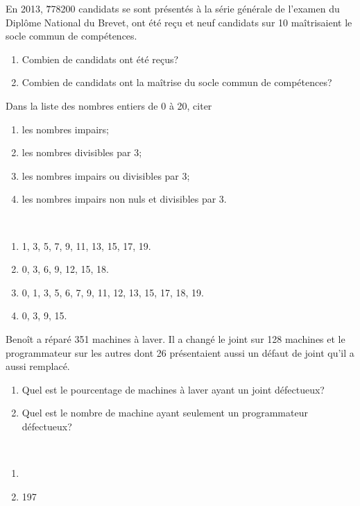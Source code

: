 \begin{autoeval}
\begin{multicols}{2}
\begin{exercice}
 	En 2013, \u{778200} candidats se sont présentés à la série générale de l'examen du Diplôme National du Brevet,  ont été reçu et neuf candidats sur 10 maîtrisaient le socle commun de compétences.
 	\begin{enumerate}
 	\item Combien de candidats ont été reçus?
 	\item Combien de candidats ont la maîtrise du socle commun de compétences?
 	\end{enumerate}
 	\begin{corrige}
 	\begin{colenumerate}{2}
 	\item {}
 	\item {}
 	\end{colenumerate}
 	\end{corrige}
 	\end{exercice}
 	\begin{exercice}
 	Dans la liste des nombres entiers de 0 à 20, citer 
 	\begin{enumerate}
 	\item les nombres impairs;
 	\item les nombres divisibles par 3;
 	\item les nombres impairs ou divisibles par 3;
 	\item les nombres impairs non nuls et divisibles par 3.
 	\end{enumerate} 	
 	\begin{corrige}
 	~\\
 	\begin{enumerate}
 	\item 1, 3, 5, 7, 9, 11, 13, 15, 17, 19.
 	\item 0, 3, 6, 9, 12, 15, 18.
 	\item 0, 1, 3, 5, 6, 7, 9, 11, 12, 13, 15, 17, 18, 19.
 	\item 0, 3, 9, 15. 
 	\end{enumerate}
 	\end{corrige}
 	\end{exercice}
 	\begin{exercice}
 	Benoît a réparé 351 machines à laver. Il a changé le joint sur 128 machines et le programmateur sur les autres dont 26 présentaient aussi un défaut de joint qu'il a aussi remplacé.
 	\begin{enumerate}
 	\item Quel est le pourcentage de machines à laver ayant un joint défectueux?
 	\item Quel est le nombre de machine ayant seulement un programmateur défectueux?
 	\end{enumerate} 	 	
 	\begin{corrige}
~\\
\begin{enumerate}
\item  {}
\item 197
\end{enumerate}
 	\end{corrige}
 	

\end{exercice}
\end{multicols}
\end{autoeval}

